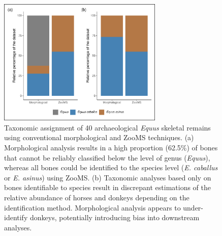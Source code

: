 \documentclass[preprint, 3p, authoryear]{elsarticle} %
\begin{document}
\begin{figure}

{\centering \includegraphics[width=0.70\textwidth]{equid_main_files/figure-latex/resultbarplotr-1} 

}

\caption{Taxonomic assignment of 40 archaeological \emph{Equus} skeletal remains using conventional morphological and ZooMS techniques. (a) Morphological analysis results in a high proportion (62.5\%) of bones that cannot be reliably classified below the level of genus (\emph{Equus}), whereas all bones could be identified to the species level (\emph{E. caballus} or \emph{E. asinus}) using ZooMS. (b) Taxonomic analyses based only on bones identifiable to species result in discrepant estimations of the relative abundance of horses and donkeys depending on the identification method. Morphological analysis appears to under-identify donkeys, potentially introducing bias into downstream analyses.}\label{fig:resultbarplotr}
\end{figure}
\end{document}
